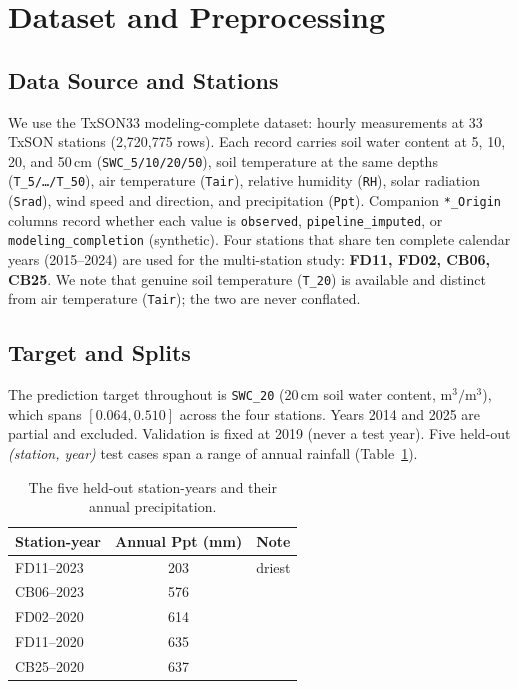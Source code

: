\documentclass[11pt]{article}
\begin{document}
\section{Dataset and Preprocessing}

\subsection{Data Source and Stations}

We use the TxSON33 modeling-complete dataset: hourly measurements at 33 TxSON
stations (2{,}720{,}775 rows). Each record carries soil water content at 5, 10,
20, and 50\,cm (\texttt{SWC\_5/10/20/50}), soil temperature at the same depths
(\texttt{T\_5/\dots/T\_50}), air temperature (\texttt{Tair}), relative humidity
(\texttt{RH}), solar radiation (\texttt{Srad}), wind speed and direction, and
precipitation (\texttt{Ppt}). Companion \texttt{*\_Origin} columns record whether
each value is \texttt{observed}, \texttt{pipeline\_imputed}, or
\texttt{modeling\_completion} (synthetic). Four stations that share ten complete
calendar years (2015--2024) are used for the multi-station study: \textbf{FD11,
FD02, CB06, CB25}. We note that genuine soil temperature (\texttt{T\_20}) is
available and distinct from air temperature (\texttt{Tair}); the two are never
conflated.

\subsection{Target and Splits}

The prediction target throughout is \texttt{SWC\_20} (20\,cm soil water content,
$\text{m}^3/\text{m}^3$), which spans $[0.064, 0.510]$ across the four stations.
Years 2014 and 2025 are partial and excluded. Validation is fixed at 2019 (never
a test year). Five held-out \emph{(station, year)} test cases span a range of
annual rainfall (Table~\ref{tab:testsy}).

\begin{table}[h]
\centering
\caption{The five held-out station-years and their annual precipitation.}
\label{tab:testsy}
\begin{tabular}{lcc}
\toprule
\textbf{Station-year} & \textbf{Annual Ppt (mm)} & \textbf{Note} \\
\midrule
FD11--2023 & 203 & driest \\
CB06--2023 & 576 & \\
FD02--2020 & 614 & \\
FD11--2020 & 635 & \\
CB25--2020 & 637 & \\
\bottomrule
\end{tabular}
\end{table}
\end{document}
